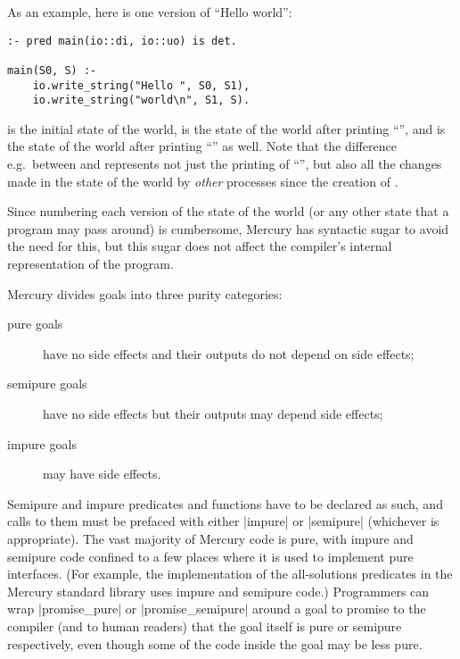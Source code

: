 As an example, here is one version of ``Hello world'':
\vspace{3mm}
\begin{verbatim}
:- pred main(io::di, io::uo) is det.

main(S0, S) :-
    io.write_string("Hello ", S0, S1),
    io.write_string("world\n", S1, S).
\end{verbatim}
\vspace{3mm}

\noindent
 is the initial state of the world,
 is the state of the world after printing ``'',
and  is the state of the world
after printing ``'' as well.
Note that the difference e.g.\ between  and 
represents not just the printing of ``'',
but also all the changes made in the state of the world
by \emph{other} processes since the creation of .

Since numbering each version of the state of the world
(or any other state that a program may pass around) is cumbersome,
Mercury has syntactic sugar to avoid the need for this,
but this sugar does not affect
the compiler's internal representation of the program.

\noindent
Mercury divides goals into three purity categories:

\begin{description}

    \item[pure goals] have no side effects
    and their outputs do not depend on side effects;

    \item[semipure goals] have no side effects
    but their outputs may depend side effects;

    \item[impure goals] may have side effects.

\end{description}

\noindent
Semipure and impure predicates and functions
have to be declared as such,
and calls to them must be prefaced with either
\code|impure| or \code|semipure| (whichever is appropriate).
The vast majority of Mercury code is pure,
with impure and semipure code confined to a few places
where it is used to implement pure interfaces.
(For example, the implementation of the all-solutions predicates
in the Mercury standard library uses impure and semipure code.)
Programmers can wrap
\code|promise\_pure| or \code|promise\_semipure| around a goal
to promise to the compiler (and to human readers) that
the goal itself is pure or semipure respectively,
even though some of the code inside the goal may be less pure.

